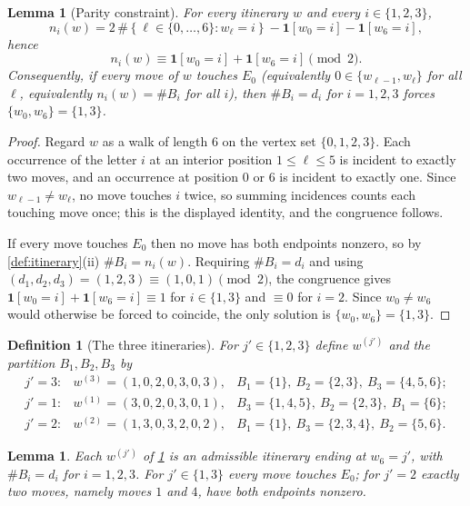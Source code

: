 \documentclass[11pt]{article}
\newtheorem{lemma}[theorem]{Lemma}
\newtheorem{definition}[theorem]{Definition}
\newcommand{\one}{\mathbf{1}}
\newcommand{\set}[1]{\left\{#1\right\}}
\newcommand{\indices}{\{1,2,3\}}
\newcommand{\Idx}{\{0,1,2,3\}}
\begin{document}
\begin{lemma}[Parity constraint]
  \label{lem:parity}
  For every itinerary $w$ and every $i\in\indices$,
  \[
    n_i(w)=2\,\#\set{\ell\in\{0,\dots,6\}: w_\ell=i}-\one[w_0=i]-\one[w_6=i],
  \]
  hence
  \[
    n_i(w)\equiv \one[w_0=i]+\one[w_6=i] \pmod 2 .
  \]
  Consequently, if every move of $w$ touches $E_0$ (equivalently
  $0\in\{w_{\ell-1},w_\ell\}$ for all $\ell$, equivalently $n_i(w)=\#B_i$ for all
  $i$), then $\#B_i=d_i$ for $i=1,2,3$ forces $\{w_0,w_6\}=\{1,3\}$.
\end{lemma}

\begin{proof}
  Regard $w$ as a walk of length $6$ on the vertex set $\Idx$.  Each
  occurrence of the letter $i$ at an interior position $1\le \ell\le 5$ is
  incident to exactly two moves, and an occurrence at position $0$ or $6$ is
  incident to exactly one.  Since $w_{\ell-1}\neq w_\ell$, no move touches $i$
  twice, so summing incidences counts each touching move once; this is the
  displayed identity, and the congruence follows.

  If every move touches $E_0$ then no move has both endpoints nonzero, so by
  \cref{def:itinerary}(ii) $\#B_i=n_i(w)$.  Requiring $\#B_i=d_i$ and using
  $(d_1,d_2,d_3)=(1,2,3)\equiv(1,0,1)\pmod2$, the congruence gives
  $\one[w_0=i]+\one[w_6=i]\equiv1$ for $i\in\{1,3\}$ and $\equiv0$ for $i=2$.
  Since $w_0\neq w_6$ would otherwise be forced to coincide, the only solution is
  $\{w_0,w_6\}=\{1,3\}$.
\end{proof}

\begin{definition}[The three itineraries]
  \label{def:three-itineraries}
  For $j'\in\indices$ define $w^{(j')}$ and the partition $B_1,B_2,B_3$ by
  \[
    \begin{array}{lll}
      j'=3: & w^{(3)}=(1,0,2,0,3,0,3), & B_1=\{1\},\ B_2=\{2,3\},\ B_3=\{4,5,6\};\\[2pt]
      j'=1: & w^{(1)}=(3,0,2,0,3,0,1), & B_3=\{1,4,5\},\ B_2=\{2,3\},\ B_1=\{6\};\\[2pt]
      j'=2: & w^{(2)}=(1,3,0,3,2,0,2), & B_1=\{1\},\ B_3=\{2,3,4\},\ B_2=\{5,6\}.
    \end{array}
  \]
\end{definition}

\begin{lemma}
  \label{lem:itineraries-admissible}
  Each $w^{(j')}$ of \cref{def:three-itineraries} is an admissible itinerary
  ending at $w_6=j'$, with $\#B_i=d_i$ for $i=1,2,3$.  For $j'\in\{1,3\}$ every
  move touches $E_0$; for $j'=2$ exactly two moves, namely moves $1$ and $4$, have
  both endpoints nonzero.
\end{lemma}
\end{document}
